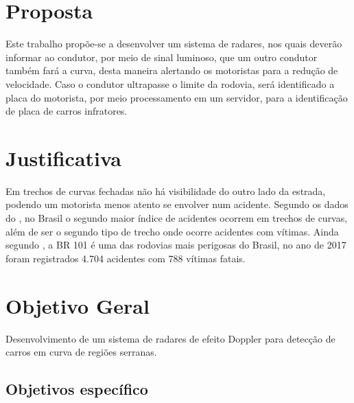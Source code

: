\section{Proposta}

Este trabalho propõe-se a desenvolver um sistema de radares, nos quais deverão informar ao condutor, por meio de sinal luminoso, que um outro condutor também fará a curva, desta maneira alertando os motoristas para a redução de velocidade. Caso o condutor ultrapasse o limite da rodovia, será identificado a placa do motorista, por meio processamento em um servidor, para a identificação de placa de carros infratores.



\section{Justificativa}

Em trechos de curvas fechadas não há visibilidade do outro lado da estrada, podendo um motorista menos atento se envolver num acidente. Segundo os dados do \cite{anuario_rodoviario}, no Brasil o segundo maior índice de acidentes ocorrem em trechos de curvas, além de ser o segundo tipo de trecho onde ocorre acidentes com vítimas. Ainda segundo \cite{anuario_rodoviario}, a BR 101 é uma das rodovias mais perigosas do Brasil, no ano de 2017 foram registrados 4.704 acidentes com 788 vítimas fatais. 

\section{Objetivo Geral}

Desenvolvimento de um sistema de radares de efeito Doppler para detecção de carros em curva de regiões serranas.


\subsection{Objetivos específico}

